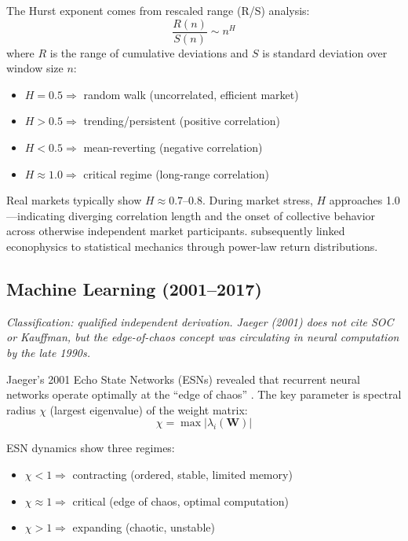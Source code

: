 \documentclass[11pt]{article}
\begin{document}
The Hurst exponent comes from rescaled range (R/S) analysis:
\begin{equation}
\frac{R(n)}{S(n)} \sim n^H
\end{equation}
where $R$ is the range of cumulative deviations and $S$ is standard deviation over window size $n$:
\begin{itemize}[nosep]
    \item $H = 0.5 \Longrightarrow$ random walk (uncorrelated, efficient market)
    \item $H > 0.5 \Longrightarrow$ trending/persistent (positive correlation)
    \item $H < 0.5 \Longrightarrow$ mean-reverting (negative correlation)
    \item $H \approx 1.0 \Longrightarrow$ critical regime (long-range correlation)
\end{itemize}

Real markets typically show $H \approx 0.7$--$0.8$. During market stress, $H$ approaches 1.0---indicating diverging correlation length and the onset of collective behavior across otherwise independent market participants. \citet{mantegna1995} subsequently linked econophysics to statistical mechanics through power-law return distributions.

\subsection{Machine Learning (2001--2017)}

\noindent\textit{Classification: qualified independent derivation. Jaeger (2001) does not cite SOC or Kauffman, but the edge-of-chaos concept was circulating in neural computation by the late 1990s.}
\smallskip

Jaeger's 2001 Echo State Networks (ESNs) revealed that recurrent neural networks operate optimally at the ``edge of chaos'' \citep{jaeger2001}. The key parameter is spectral radius $\chi$ (largest eigenvalue) of the weight matrix:
\begin{equation}
\chi = \max |\lambda_i(\mathbf{W})|
\end{equation}

ESN dynamics show three regimes:
\begin{itemize}[nosep]
    \item $\chi < 1 \Longrightarrow$ contracting (ordered, stable, limited memory)
    \item $\chi \approx 1 \Longrightarrow$ critical (edge of chaos, optimal computation)
    \item $\chi > 1 \Longrightarrow$ expanding (chaotic, unstable)
\end{itemize}
\end{document}
